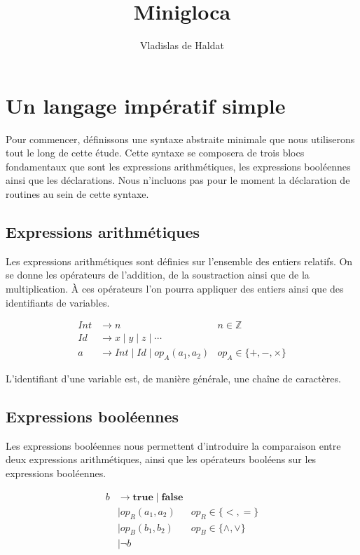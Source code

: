 \documentclass[a4paper, 12pt]{article}
\title{Minigloca}
\author{Vladislas de Haldat}
\begin{document}
\maketitle
\newpage
\tableofcontents
\newpage

\section{Un langage impératif simple}
Pour commencer, définissons une syntaxe abstraite minimale que nous utiliserons tout le long de cette étude. Cette syntaxe se composera de trois blocs fondamentaux que sont les expressions arithmétiques, les expressions booléennes ainsi que les déclarations. Nous n'incluons pas pour le moment la déclaration de routines au sein de cette syntaxe.

\subsection{Expressions arithmétiques}
Les expressions arithmétiques sont définies sur l'ensemble des entiers relatifs. On se donne les opérateurs de l'addition, de la soustraction ainsi que de la multiplication. À ces opérateurs l'on pourra appliquer des entiers ainsi que des identifiants de variables.

\begin{align*}
Int &\rightarrow n &n \in \mathbb{Z}\\
Id &\rightarrow x \mid y \mid z \mid \cdots \\
a &\rightarrow Int \mid Id \mid op_A(a_1, a_2) &op_A \in \{+, -, \times\}
\end{align*}

L'identifiant d'une variable est, de manière générale, une chaîne de caractères.

\subsection{Expressions booléennes}
Les expressions booléennes nous permettent d'introduire la comparaison entre deux expressions arithmétiques, ainsi que les opérateurs booléens sur les expressions booléennes.

\begin{align*}
b & \rightarrow \textbf{true} \mid \textbf{false} & \\
  & \mid op_R(a_1, a_2) & op_R \in \{<, =\} \\
  & \mid op_B(b_1, b_2) & op_B \in \{\wedge, \vee\} \\
  & \mid \neg b &
\end{align*}
\end{document}
